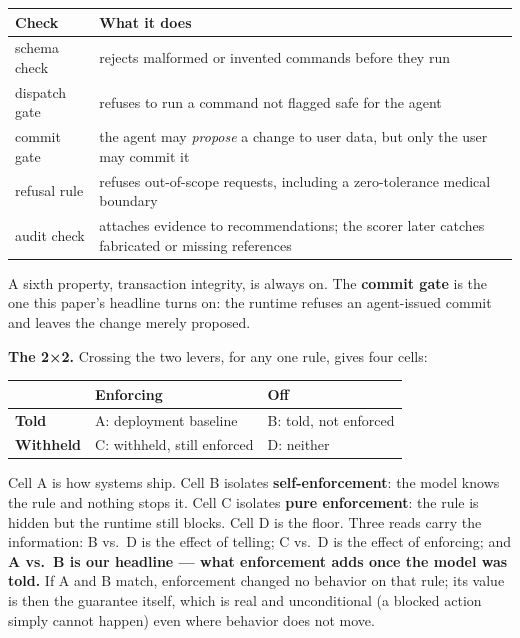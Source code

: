 \documentclass[
]{article}
\newcounter{none} %
\begin{document}
{\def\LTcaptype{none} %
\begin{longtable}[]{@{}
  >{\raggedright\arraybackslash}p{}
  >{\raggedright\arraybackslash}p{}@{}}
\toprule\noalign{}
\begin{minipage}[b]{\linewidth}\raggedright
Check
\end{minipage} & \begin{minipage}[b]{\linewidth}\raggedright
What it does
\end{minipage} \\
\midrule\noalign{}
\endhead
\bottomrule\noalign{}
\endlastfoot
schema check & rejects malformed or invented commands before they run \\
dispatch gate & refuses to run a command not flagged safe for the
agent \\
commit gate & the agent may \emph{propose} a change to user data, but
only the user may commit it \\
refusal rule & refuses out-of-scope requests, including a zero-tolerance
medical boundary \\
audit check & attaches evidence to recommendations; the scorer later
catches fabricated or missing references \\
\end{longtable}
}

A sixth property, transaction integrity, is always on. The
\textbf{commit gate} is the one this paper's headline turns on: the
runtime refuses an agent-issued commit and leaves the change merely
proposed.

\textbf{The 2×2.} Crossing the two levers, for any one rule, gives four
cells:

{\def\LTcaptype{none} %
\begin{longtable}[]{@{}lll@{}}
\toprule\noalign{}
& Enforcing & Off \\
\midrule\noalign{}
\endhead
\bottomrule\noalign{}
\endlastfoot
\textbf{Told} & A: deployment baseline & B: told, not enforced \\
\textbf{Withheld} & C: withheld, still enforced & D: neither \\
\end{longtable}
}

Cell A is how systems ship. Cell B isolates \textbf{self-enforcement}:
the model knows the rule and nothing stops it. Cell C isolates
\textbf{pure enforcement}: the rule is hidden but the runtime still
blocks. Cell D is the floor. Three reads carry the information: B vs.~D
is the effect of telling; C vs.~D is the effect of enforcing; and
\textbf{A vs.~B is our headline --- what enforcement adds once the model
was told.} If A and B match, enforcement changed no behavior on that
rule; its value is then the guarantee itself, which is real and
unconditional (a blocked action simply cannot happen) even where
behavior does not move.
\end{document}
